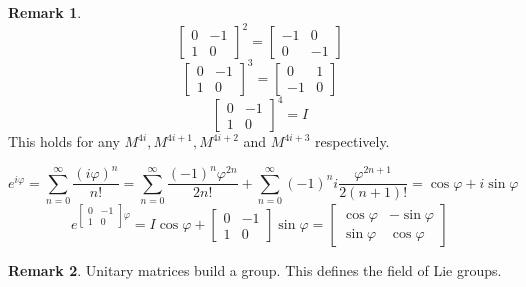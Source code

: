\documentclass[a4paper,landscape,twocolumn]{article}
\theoremstyle{definition}
\newtheorem{rem}{Remark}
\begin{document}
\begin{rem}
  \[ \begin{bmatrix} 0 & -1 \\ 1 & 0 \end{bmatrix}^2 = \begin{bmatrix} -1 & 0 \\ 0 & -1 \end{bmatrix} \]
  \[ \begin{bmatrix} 0 & -1 \\ 1 & 0 \end{bmatrix}^3 = \begin{bmatrix} 0 & 1 \\ -1 & 0 \end{bmatrix} \]
  \[ \begin{bmatrix} 0 & -1 \\ 1 & 0 \end{bmatrix}^4 = I \]
  This holds for any $M^{4i}, M^{4i+1}, M^{4i+2}$ and $M^{4i+3}$ respectively.

  \[ e^{i\varphi} = \sum_{n=0}^\infty \frac{(i\varphi)^n}{n!} = \sum_{n=0}^\infty \frac{(-1)^n \varphi^{2n}}{2n!} + \sum_{n=0}^{\infty} (-1)^n i \frac{\varphi^{2n+1}}{2(n+1)!} = \cos{\varphi} + i \sin{\varphi} \]
  \[ e^{\begin{bmatrix} 0 & -1 \\ 1 & 0 \end{bmatrix} \varphi} = I \cos{\varphi} + \begin{bmatrix} 0 & -1 \\ 1 & 0 \end{bmatrix} \sin{\varphi} = \begin{bmatrix} \cos{\varphi} & -\sin{\varphi} \\ \sin{\varphi} & \cos{\varphi} \end{bmatrix} \]
\end{rem}
\begin{rem}

  Unitary matrices build a group. This defines the field of Lie groups.
\end{rem}
\end{document}
